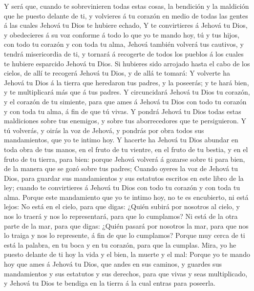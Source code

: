  Y será que, cuando te sobrevinieren todas estas cosas, la
bendición y la maldición que he puesto delante de ti, y volvieres á tu
corazón en medio de todas las gentes á las cuales Jehová tu Dios te
hubiere echado,  Y te convirtieres á Jehová tu Dios, y
obedecieres á su voz conforme á todo lo que yo te mando hoy, tú y tus
hijos, con todo tu corazón y con toda tu alma,  Jehová
también volverá tus cautivos, y tendrá misericordia de ti, y tornará á
recogerte de todos los pueblos á los cuales te hubiere esparcido Jehová
tu Dios.  Si hubieres sido arrojado hasta el cabo de los
cielos, de allí te recogerá Jehová tu Dios, y de allá te tomará:
 Y volverte ha Jehová tu Dios á la tierra que heredaron
tus padres, y la poseerás; y te hará bien, y te multiplicará más que á
tus padres.  Y circuncidará Jehová tu Dios tu corazón, y
el corazón de tu simiente, para que ames á Jehová tu Dios con todo tu
corazón y con toda tu alma, á fin de que tú vivas.  Y
pondrá Jehová tu Dios todas estas maldiciones sobre tus enemigos, y
sobre tus aborrecedores que te persiguieron.  Y tú
volverás, y oirás la voz de Jehová, y pondrás por obra todos sus
mandamientos, que yo te intimo hoy.  Y hacerte ha Jehová
tu Dios abundar en toda obra de tus manos, en el fruto de tu vientre, en
el fruto de tu bestia, y en el fruto de tu tierra, para bien: porque
Jehová volverá á gozarse sobre ti para bien, de la manera que se gozó
sobre tus padres;  Cuando oyeres la voz de Jehová tu
Dios, para guardar sus mandamientos y sus estatutos escritos en este
libro de la ley; cuando te convirtieres á Jehová tu Dios con todo tu
corazón y con toda tu alma.  Porque este mandamiento que
yo te intimo hoy, no te es encubierto, ni está lejos:  No
está en el cielo, para que digas: ¿Quién subirá por nosotros al cielo, y
nos lo traerá y nos lo representará, para que lo cumplamos?
 Ni está de la otra parte de la mar, para que digas:
¿Quién pasará por nosotros la mar, para que nos lo traiga y nos lo
represente, á fin de que lo cumplamos?  Porque muy cerca
de ti está la palabra, en tu boca y en tu corazón, para que la cumplas.
 Mira, yo he puesto delante de ti hoy la vida y el bien,
la muerte y el mal:  Porque yo te mando hoy que ames á
Jehová tu Dios, que andes en sus caminos, y guardes sus mandamientos y
sus estatutos y sus derechos, para que vivas y seas multiplicado, y
Jehová tu Dios te bendiga en la tierra á la cual entras para poseerla.
